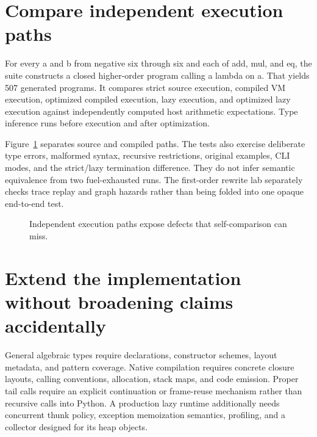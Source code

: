 \section{Compare independent execution paths}
\label{sec:ch93-tests}
For every a and b from negative six through six and each of add, mul, and eq, the suite constructs a closed higher-order program calling a lambda on a.
That yields 507 generated programs.
It compares strict source execution, compiled VM execution, optimized compiled execution, lazy execution, and optimized lazy execution against independently computed host arithmetic expectations.
Type inference runs before execution and after optimization.

Figure~\ref{fig:ch93-oracles} separates source and compiled paths.
The tests also exercise deliberate type errors, malformed syntax, recursive restrictions, original examples, CLI modes, and the strict/lazy termination difference.
They do not infer semantic equivalence from two fuel-exhausted runs.
The first-order rewrite lab separately checks trace replay and graph hazards rather than being folded into one opaque end-to-end test.

\begin{figure}[htbp]
\centering
{}
\caption{Independent execution paths expose defects that self-comparison can miss.}
\label{fig:ch93-oracles}
\end{figure}

\section{Extend the implementation without broadening claims accidentally}
\label{sec:ch93-next}
General algebraic types require declarations, constructor schemes, layout metadata, and pattern coverage.
Native compilation requires concrete closure layouts, calling conventions, allocation, stack maps, and code emission.
Proper tail calls require an explicit continuation or frame-reuse mechanism rather than recursive calls into Python.
A production lazy runtime additionally needs concurrent thunk policy, exception memoization semantics, profiling, and a collector designed for its heap objects.

